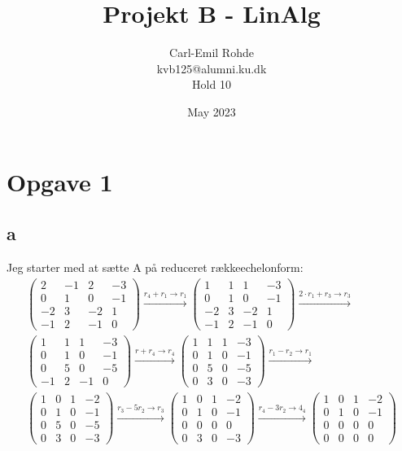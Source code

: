 \documentclass{article}
\title{Projekt B - LinAlg}
\author{Carl-Emil Rohde \\ kvb125@alumni.ku.dk \\ Hold 10}
\date{May 2023}
\begin{document}
\maketitle

\section*{Opgave 1}

\subsection*{a}
Jeg starter med at sætte A på reduceret rækkeechelonform:
$$
\begin{aligned}
& \left(\begin{array}{cccc}
2 & -1 & 2 & -3 \\
0 & 1 & 0 & -1 \\
-2 & 3 & -2 & 1 \\
-1 & 2 & -1 & 0
\end{array}\right) \stackrel{r_4+r_1 \rightarrow r_1}{\longrightarrow}\left(\begin{array}{cccc}
1 & 1 & 1 & -3 \\
0 & 1 & 0 & -1 \\
-2 & 3 & -2 & 1 \\
-1 & 2 & -1 & 0
\end{array}\right) \stackrel{2 \cdot r_1+r_3 \rightarrow r_3}{\longrightarrow} \\
& \left(\begin{array}{cccc}
1 & 1 & 1 & -3 \\
0 & 1 & 0 & -1 \\
0 & 5 & 0 & -5 \\
-1 & 2 & -1 & 0
\end{array}\right) \stackrel{r+r_4 \rightarrow r_4}{\longrightarrow}\left(\begin{array}{llll}
1 & 1 & 1 & -3 \\
0 & 1 & 0 & -1 \\
0 & 5 & 0 & -5 \\
0 & 3 & 0 & -3
\end{array}\right) \stackrel{r_1-r_2 \rightarrow r_1}{\longrightarrow} \\
& \left(\begin{array}{llll}
1 & 0 & 1 & -2 \\
0 & 1 & 0 & -1 \\
0 & 5 & 0 & -5 \\
0 & 3 & 0 & -3
\end{array}\right) \stackrel{r_3-5 r_2 \rightarrow r_3}{\longrightarrow}\left(\begin{array}{cccc}
1 & 0 & 1 & -2 \\
0 & 1 & 0 & -1 \\
0 & 0 & 0 & 0 \\
0 & 3 & 0 & -3
\end{array}\right) \stackrel{r_4-3 r_2 \rightarrow 4_4}{\longrightarrow}\left(\begin{array}{cccc}
1 & 0 & 1 & -2 \\
0 & 1 & 0 & -1 \\
0 & 0 & 0 & 0 \\
0 & 0 & 0 & 0
\end{array}\right)
&
\end{aligned}
$$
\end{document}
